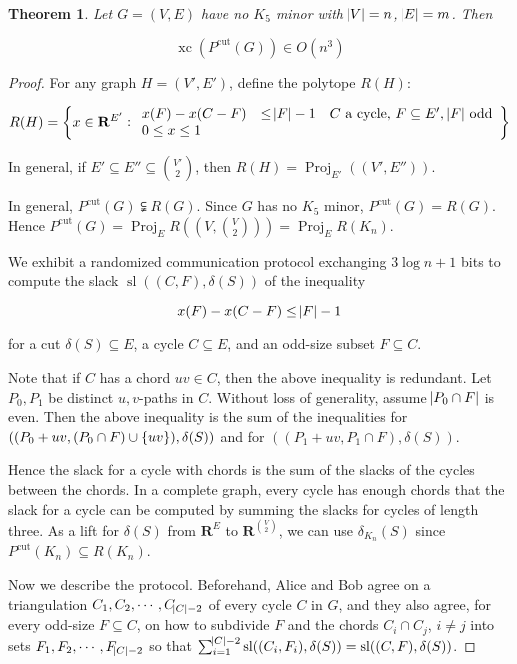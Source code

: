 \documentclass{article}
\newtheorem{theorem}{Theorem}
\DeclareMathOperator{\xc}{xc}
\DeclareMathOperator{\proj}{Proj}
\DeclareMathOperator{\Sl}{sl}
\begin{document}
\begin{theorem}
Let $G=(V,E)$ have no $K_5$ minor with $\abs{V}=n$, $\abs{E}=m$. Then 

$$\xc(P^{\text{cut}}(G)) \in O(n^3)$$
\end{theorem}
\begin{proof}
For any graph $H=(V', E')$, define the polytope $R(H)$:

$$R(H) = \cbr{x\in \mathbf{R}^{E'}: \begin{array}{lll} x(F) - x(C-F) & \leq \abs{F} - 1 & \text{$C$ a cycle, $F\subseteq E'$, $\abs{F}$ odd} \\ 0 \leq x \leq 1 \end{array}}$$

In general, if $E' \subseteq E'' \subseteq {V'\choose 2}$, then
$R(H) = \proj_{E'}((V', E''))$.

	In general, $P^{\text{cut}}(G) \subsetneqq R(G)$.
	Since $G$ has no $K_5$ minor, $P^{\text{cut}}(G) = R(G)$.
	Hence $P^{\text{cut}}(G) = \proj_{E} R((V, {V\choose 2}))=\proj_{E} R(K_n)$.

We exhibit a randomized communication protocol exchanging $3\log n + 1$ bits
	to compute the slack $\Sl((C,F), \delta(S))$ of
the inequality

$$x(F) - x(C-F)\leq \abs{F}-1$$

for a cut $\delta(S)\subseteq E$, a cycle $C\subseteq E$, and an odd-size
subset $F\subseteq C$.

Note that if $C$ has a chord $uv\in C$, then the above inequality is redundant.
Let $P_0, P_1$ be distinct $u,v$-paths in  $C$. Without loss
of generality, assume $\abs{P_0\cap F}$ is even. Then the above inequality
is the sum of the inequalities for $((P_0 + uv, (P_0 \cap F)\cup\cbr{uv}), \delta(S))$
and for $((P_1 + uv, P_1\cap F), \delta(S))$.

Hence the slack for a cycle with chords is the sum of the slacks of the cycles
between the chords. In a complete graph, every cycle has enough chords
that the slack for a cycle can be computed by summing the slacks for
cycles of length three. As a lift for $\delta(S)$ 
from $\mathbf{R}^E$ to $\mathbf{R}^{{V\choose 2}}$,
we can use $\delta_{K_n}(S)$ since $P^{\text{cut}}(K_n) \subseteq R(K_n)$.

Now we describe the protocol. Beforehand, Alice and Bob agree
on a triangulation $C_1, C_2, \cdots, C_{\abs{C}-2}$ of every cycle $C$ in $G$,
and they also agree, for every odd-size $F\subseteq C$, on how to subdivide
$F$ and the chords $C_i\cap C_j$, $i\neq j$ into sets 
$F_1, F_2,\cdots, F_{\abs{C}-2}$ so that $\sum_{i=1}^{\abs{C}-2} \Sl((C_i, F_i),\delta(S)) = \Sl((C, F), \delta(S))$.


\end{proof}
\end{document}

